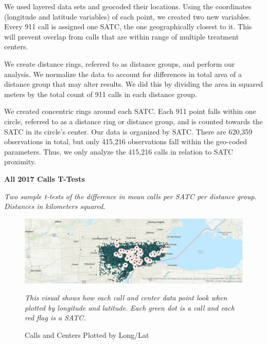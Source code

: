 \documentclass[12pt]{article}
\begin{document}
We used layered data sets and geocoded their locations. Using the coordinates (longitude and latitude variables) of each point, we created two new variables. Every 911 call is assigned one SATC, the one geographically closest to it. This will prevent overlap from calls that are within range of multiple treatment centers.

We create distance rings, referred to as distance groups, and perform our analysis. We normalize the data to account for differences in total area of a distance group that may alter results. We did this by dividing the area in squared meters by the total count of 911 calls in each distance group.

We created concentric rings around each SATC. Each 911 point falls within one circle, referred to as a distance ring or distance group, and is counted towards the SATC in its circle's center. Our data is organized by SATC. There are 620,359 observations in total, but only 415,216 observations fall within the geo-coded parameters. Thus, we only analyze the 415,216 calls in relation to SATC proximity. 
\begin{table}[h]
\centering
\scalebox{0.8}{
\centering

}


\caption{\textbf{All 2017 Calls T-Tests}}
\label{tabl:Table}
\centering\textit{Two sample t-tests of the difference in mean calls per SATC per distance group.}
\textit{Distances in kilometers squared.}
\end{table}


\begin{figure}[h!]
    \centering
\includegraphics[width=0.75\linewidth]{Reproducibility Package/Visual Graphics/ArcGIS_Map.jpg}
    \caption{Calls and Centers Plotted by Long/Lat}
    \label{fig:Figure2}
     \textit{This visual shows how each call and center data point look when plotted by longitude and latitude.}
     \textit{Each green dot is a call and each red flag is a SATC.}
    
\end{figure}


\end{document}
